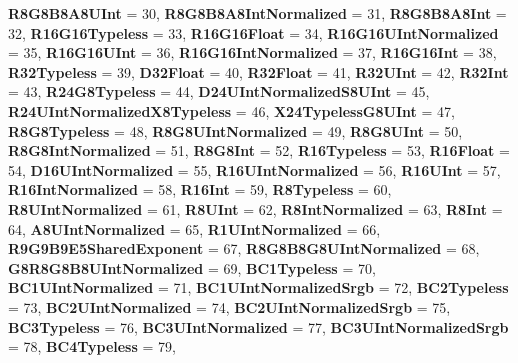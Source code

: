 \begin{DoxyCompactItemize}
\newline
{\bfseries R8\+G8\+B8\+A8\+U\+Int} = 30, 
{\bfseries R8\+G8\+B8\+A8\+Int\+Normalized} = 31, 
{\bfseries R8\+G8\+B8\+A8\+Int} = 32, 
{\bfseries R16\+G16\+Typeless} = 33, 
\newline
{\bfseries R16\+G16\+Float} = 34, 
{\bfseries R16\+G16\+U\+Int\+Normalized} = 35, 
{\bfseries R16\+G16\+U\+Int} = 36, 
{\bfseries R16\+G16\+Int\+Normalized} = 37, 
\newline
{\bfseries R16\+G16\+Int} = 38, 
{\bfseries R32\+Typeless} = 39, 
{\bfseries D32\+Float} = 40, 
{\bfseries R32\+Float} = 41, 
\newline
{\bfseries R32\+U\+Int} = 42, 
{\bfseries R32\+Int} = 43, 
{\bfseries R24\+G8\+Typeless} = 44, 
{\bfseries D24\+U\+Int\+Normalized\+S8\+U\+Int} = 45, 
\newline
{\bfseries R24\+U\+Int\+Normalized\+X8\+Typeless} = 46, 
{\bfseries X24\+Typeless\+G8\+U\+Int} = 47, 
{\bfseries R8\+G8\+Typeless} = 48, 
{\bfseries R8\+G8\+U\+Int\+Normalized} = 49, 
\newline
{\bfseries R8\+G8\+U\+Int} = 50, 
{\bfseries R8\+G8\+Int\+Normalized} = 51, 
{\bfseries R8\+G8\+Int} = 52, 
{\bfseries R16\+Typeless} = 53, 
\newline
{\bfseries R16\+Float} = 54, 
{\bfseries D16\+U\+Int\+Normalized} = 55, 
{\bfseries R16\+U\+Int\+Normalized} = 56, 
{\bfseries R16\+U\+Int} = 57, 
\newline
{\bfseries R16\+Int\+Normalized} = 58, 
{\bfseries R16\+Int} = 59, 
{\bfseries R8\+Typeless} = 60, 
{\bfseries R8\+U\+Int\+Normalized} = 61, 
\newline
{\bfseries R8\+U\+Int} = 62, 
{\bfseries R8\+Int\+Normalized} = 63, 
{\bfseries R8\+Int} = 64, 
{\bfseries A8\+U\+Int\+Normalized} = 65, 
\newline
{\bfseries R1\+U\+Int\+Normalized} = 66, 
{\bfseries R9\+G9\+B9\+E5\+Shared\+Exponent} = 67, 
{\bfseries R8\+G8\+B8\+G8\+U\+Int\+Normalized} = 68, 
{\bfseries G8\+R8\+G8\+B8\+U\+Int\+Normalized} = 69, 
\newline
{\bfseries B\+C1\+Typeless} = 70, 
{\bfseries B\+C1\+U\+Int\+Normalized} = 71, 
{\bfseries B\+C1\+U\+Int\+Normalized\+Srgb} = 72, 
{\bfseries B\+C2\+Typeless} = 73, 
\newline
{\bfseries B\+C2\+U\+Int\+Normalized} = 74, 
{\bfseries B\+C2\+U\+Int\+Normalized\+Srgb} = 75, 
{\bfseries B\+C3\+Typeless} = 76, 
{\bfseries B\+C3\+U\+Int\+Normalized} = 77, 
\newline
{\bfseries B\+C3\+U\+Int\+Normalized\+Srgb} = 78, 
{\bfseries B\+C4\+Typeless} = 79, 

\end{DoxyCompactItemize}
